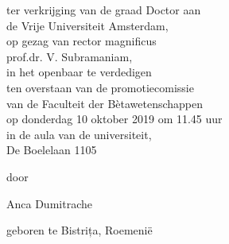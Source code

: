 \thispagestyle{empty}

\begin{addmargin}[1cm]{-1cm}
\begin{center}

  \vfill

  \large{}

  \vfill

  \Huge \myTitle

  \vfill

  \large{}

  \vfill
  
  ter verkrijging van de graad Doctor aan\\
  de Vrije Universiteit Amsterdam,\\
  op gezag van rector magnificus\\
  prof.dr. V. Subramaniam,\\
  in het openbaar te verdedigen\\
  ten overstaan van de promotiecomissie\\
  van de Faculteit der Bètawetenschappen\\
  op donderdag 10 oktober 2019 om 11.45 uur\\
  in de aula van de universiteit,\\
  De Boelelaan 1105 %
  
  \vfill
  
  door\\\bigskip

  Anca Dumitrache\\\bigskip

  geboren te Bistrița, Roemenië

  \vfill

\end{center}
\end{addmargin}